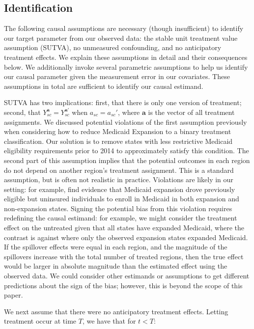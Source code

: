 \subsection{Identification}

The following causal assumptions are necessary (though insufficient) to identify our target parameter from our observed data: the stable unit treatment value assumption (SUTVA), no unmeasured confounding, and no anticipatory treatment effects. We explain these assumptions in detail and their consequences below. We additionally invoke several parametric assumptions to help us identify our causal parameter given the measurement error in our covariates. These assumptions in total are sufficient to identify our causal estimand.

SUTVA has two implications: first, that there is only one version of treatment; second, that $Y_{sc}^{\mathbf{a}} = Y_{sc}^{\mathbf{a}'}$ when $a_{sc} = a_{sc}'$, where $\mathbf{a}$ is the vector of all treatment assignments. We discussed potential violations of the first assumption previously when considering how to reduce Medicaid Expansion to a binary treatment classification. Our solution is to remove states with less restrictive Medicaid eligibility requirements prior to 2014 to approximately satisfy this condition. The second part of this assumption implies that the potential outcomes in each region do not depend on another region's treatment assignment. This is a standard assumption, but is often not realistic in practice. Violations are likely in our setting: for example, \cite{frean2017premium} find evidence that Medicaid expansion drove previously eligible but uninsured individuals to enroll in Medicaid in both expansion and non-expansion states. Signing the potential bias from this violation requires redefining the causal estimand: for example, we might consider the treatment effect on the untreated given that all states have expanded Medicaid, where the contrast is against where only the observed expansion states expanded Medicaid. If the spillover effects were equal in each region, and the magnitude of the spillovers increase with the total number of treated regions, then the true effect would be larger in absolute magnitude than the estimated effect using the observed data. We could consider other estimands or assumptions to get different predictions about the sign of the bias; however, this is beyond the scope of this paper.

We next assume that there were no anticipatory treatment effects. Letting treatment occur at time $T$, we have that for $t < T$:

